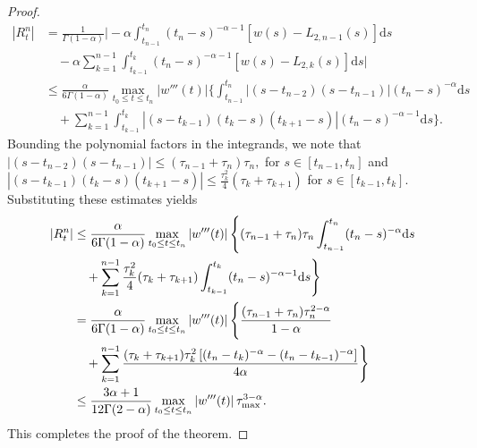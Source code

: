\documentclass{siamart171218}
\theoremstyle{remark}
\theoremstyle{example}
\numberwithin{equation}{section}
\begin{document}
\begin{proof}
	\begin{align*}
		\left|R_t^n\right|&= \frac{1}{\Gamma(1-\alpha)} \Bigg| -\alpha \int_{t_{n-1}}^{t_n} (t_n - s)^{-\alpha-1} \left[ w(s) - L_{2,n-1}(s) \right]  \mathrm{d}s \\
		&\quad - \alpha \sum_{k=1}^{n-1} \int_{t_{k-1}}^{t_k} (t_n - s)^{-\alpha-1} \left[ w(s) - L_{2,k}(s) \right]  \mathrm{d}s \Bigg| \\
		&\leq \frac{\alpha}{6\Gamma(1-\alpha)} \max_{t_0 \leq t \leq t_n} |w'''(t)| \Bigg\{ \int_{t_{n-1}}^{t_n} \left|(s - t_{n-2})(s - t_{n-1})\right| (t_n - s)^{-\alpha}  \mathrm{d}s \\
		&\quad + \sum_{k=1}^{n-1} \int_{t_{k-1}}^{t_k} \left|(s - t_{k-1})(t_k - s)(t_{k+1} - s)\right| (t_n - s)^{-\alpha-1}  \mathrm{d}s \Bigg\}.
	\end{align*}
	Bounding the polynomial factors in the integrands, we note that
	$
		|(s - t_{n-2})(s - t_{n-1})| \leq (\tau_{n-1} + \tau_n) \tau_n,
	$
	 for $s \in [t_{n-1}, t_n]$ and
	$
		|(s - t_{k-1})(t_k - s)(t_{k+1} - s)| \leq \frac{\tau_k^2}{4} (\tau_k + \tau_{k+1})
$ for $s \in [t_{k-1}, t_k]$. Substituting these estimates yields
	\begin{align*}
		\left|R_t^n\right| &\leq \frac{\alpha}{6\Gamma(1-\alpha)} \max_{t_0 \leq t \leq t_n} \left|w'''(t)\right| \Bigg\{ (\tau_{n-1} + \tau_n) \tau_n \int_{t_{n-1}}^{t_n} (t_n - s)^{-\alpha}  \mathrm{d}s \vspace{0.3cm}\\
		&\quad + \sum_{k=1}^{n-1} \frac{\tau_k^2}{4} (\tau_k + \tau_{k+1}) \int_{t_{k-1}}^{t_k} (t_n - s)^{-\alpha-1}  \mathrm{d}s \Bigg\}\vspace{0.3cm} \\
		&= \frac{\alpha}{6\Gamma(1-\alpha)} \max_{t_0 \leq t \leq t_n}
 \left|w'''(t)\right| \Bigg\{ \frac{(\tau_{n-1} + \tau_n) \tau_n^{2-\alpha}}{1 - \alpha}\vspace{0.3cm} \\
		&\quad + \sum_{k=1}^{n-1}
\frac{(\tau_k + \tau_{k+1}) \tau_k^2\left[(t_n - t_k)^{-\alpha} - (t_n - t_{k-1})^{-\alpha}\right]}{4\alpha} \Bigg\} \vspace{0.3cm}\\
		&\leq \frac{3\alpha + 1}{12\Gamma(2-\alpha)} \max_{t_0 \leq t \leq t_n}
\left|w'''(t)\right| \tau_{\max}^{3-\alpha}.
	\end{align*}
This completes the proof of the theorem.
\end{proof}
\end{document}
